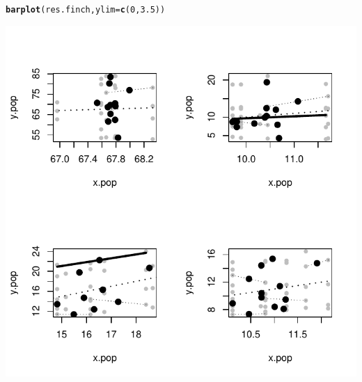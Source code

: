 \documentclass[12pt]{article}\usepackage[]{graphicx}\usepackage[]{color}
\makeatletter
\def\maxwidth{ %
  \ifdim\Gin@nat@width>\linewidth
    \linewidth
  \else
    \Gin@nat@width
  \fi
}
\newcommand{\hlnum}[1]{\textcolor[rgb]{0.686,0.059,0.569}{#1}}%
\newcommand{\hlstd}[1]{\textcolor[rgb]{0.345,0.345,0.345}{#1}}%
\newcommand{\hlkwc}[1]{\textcolor[rgb]{0.333,0.667,0.333}{#1}}%
\newcommand{\hlkwd}[1]{\textcolor[rgb]{0.737,0.353,0.396}{\textbf{#1}}}%
\newenvironment{kframe}{%
 \def\at@end@of@kframe{}%
 \ifinner\ifhmode%
  \def\at@end@of@kframe{\end{minipage}}%
  \begin{minipage}{\columnwidth}%
 \fi\fi%
 \def\FrameCommand##1{\hskip\@totalleftmargin \hskip-\fboxsep
 \colorbox{shadecolor}{##1}\hskip-\fboxsep
     \hskip-\linewidth \hskip-\@totalleftmargin \hskip\columnwidth}%
 \MakeFramed {\advance\hsize-\width
   \@totalleftmargin\z@ \linewidth\hsize
   \@setminipage}}%
 {\par\unskip\endMakeFramed%
 \at@end@of@kframe}
\newenvironment{knitrout}{}{} %
\makeatother
\begin{document}
\begin{knitrout}
\color{fgcolor}\begin{kframe}
\begin{alltt}
\hlkwd{barplot}\hlstd{(res.finch,} \hlkwc{ylim}\hlstd{=}\hlkwd{c}\hlstd{(}\hlnum{0}\hlstd{,}\hlnum{3.5}\hlstd{))}
\end{alltt}
\end{kframe}

{\centering \includegraphics[width=\maxwidth]{figure/unnamed-chunk-31} 

}



\end{knitrout}
\end{document}
